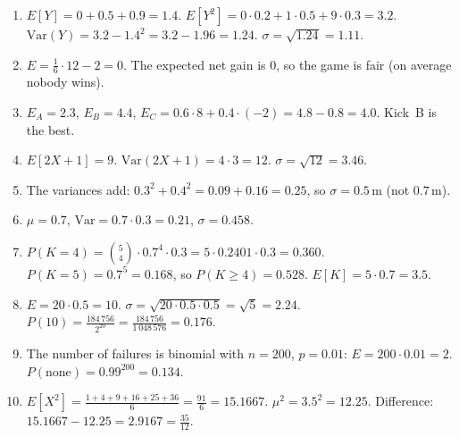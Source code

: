 \begin{enumerate}[label=\textbf{\ansnum.\arabic*}]
  \item $E[Y]=0+0.5+0.9=1.4$. $E[Y^2]=0\cdot0.2+1\cdot0.5+9\cdot0.3=3.2$. $\mathrm{Var}(Y)=3.2-1.4^2=3.2-1.96=1.24$. $\sigma=\sqrt{1.24}=1.11$.
  \item $E=\frac16\cdot12-2=0$. The expected net gain is $0$, so the game is fair (on average nobody wins).
  \item $E_A=2.3$, $E_B=4.4$, $E_C=0.6\cdot8+0.4\cdot(-2)=4.8-0.8=4.0$. Kick~B is the best.
  \item $E[2X+1]=9$. $\mathrm{Var}(2X+1)=4\cdot3=12$. $\sigma=\sqrt{12}=3.46$.
  \item The variances add: $0.3^2+0.4^2=0.09+0.16=0.25$, so $\sigma=0.5$\,m (not $0.7$\,m).
  \item $\mu=0.7$, $\mathrm{Var}=0.7\cdot0.3=0.21$, $\sigma=0.458$.
  \item $P(K=4)=\binom54\cdot0.7^4\cdot0.3=5\cdot0.2401\cdot0.3=0.360$. $P(K=5)=0.7^5=0.168$, so $P(K\ge4)=0.528$. $E[K]=5\cdot0.7=3.5$.
  \item $E=20\cdot0.5=10$. $\sigma=\sqrt{20\cdot0.5\cdot0.5}=\sqrt5=2.24$. $P(10)=\frac{184\,756}{2^{20}}=\frac{184\,756}{1\,048\,576}=0.176$.
  \item The number of failures is binomial with $n=200$, $p=0.01$: $E=200\cdot0.01=2$. $P(\text{none})=0.99^{200}=0.134$.
  \item[\textbf{\ansnum.10}] $E[X^2]=\frac{1+4+9+16+25+36}{6}=\frac{91}{6}=15.1667$. $\mu^2=3.5^2=12.25$. Difference: $15.1667-12.25=2.9167=\frac{35}{12}$.
\end{enumerate}
